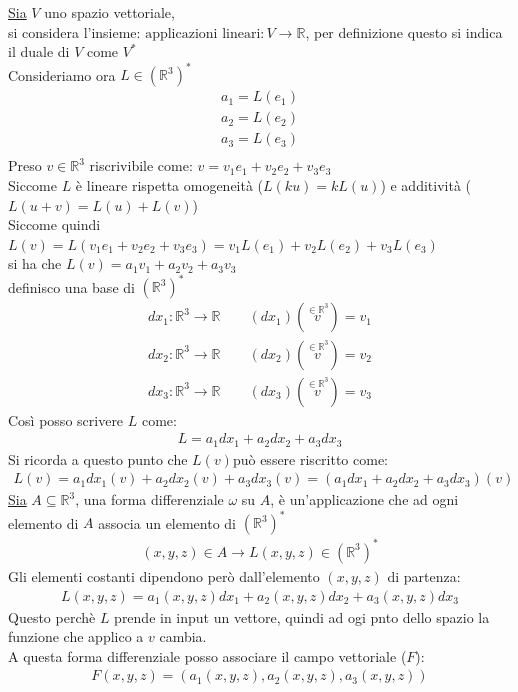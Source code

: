 \documentclass[a4paper, oneside]{article}
\begin{document}
\begin{definition}
    \underline{Sia} $V$ uno spazio vettoriale,\\
    si considera l'insieme: $\text{applicazioni lineari} :V \to \mathbb{R}$, per definizione questo si indica il duale di $V$ come $V^*$\\
    Consideriamo ora $L \in (\mathbb{R}^{3})^*$
    \begin{gather*}
        a_1=L(e_1)\\
        a_2=L(e_2)\\
        a_3=L(e_3)\\
    \end{gather*}
    Preso $v \in \mathbb{R}^3$ riscrivibile come: $v = v_1 e_1 + v_2 e_2 + v_3 e_3$\\
    Siccome $L$ è lineare rispetta omogeneità ($L(ku) = kL(u)$) e additività ($L(u+v) = L(u) + L(v)$)\\
    Siccome quindi $L(v) = L(v_1 e_1 + v_2 e_2 + v_3 e_3) = v_1 L(e_1) + v_2 L(e_2) + v_3 L(e_3)$\\
    si ha che $L(v) = a_1v_1+a_2v_2+a_3v_3$\\
    definisco una base di $(\mathbb{R}^3)^*$
    \begin{gather*}
        dx_1 : \mathbb{R}^3 \to \mathbb{R} \qquad (dx_1)(\overset{\in \mathbb{R}^3}{v}) = v_1\\
        dx_2 : \mathbb{R}^3 \to \mathbb{R} \qquad (dx_2)(\overset{\in \mathbb{R}^3}{v}) = v_2\\
        dx_3 : \mathbb{R}^3 \to \mathbb{R} \qquad (dx_3)(\overset{\in \mathbb{R}^3}{v}) = v_3
    \end{gather*}
    Così posso scrivere $L$ come:
    \begin{gather*}
        L = a_1 dx_1 + a_2 dx_2 + a_3 dx_3
    \end{gather*}
    Si ricorda a questo punto che $L(v)$può essere riscritto come:
    \begin{gather*}
        L(v) = a_1 dx_1(v) + a_2 dx_2(v) + a_3 dx_3(v) = (a_1 dx_1 + a_2 dx_2 + a_3 dx_3)(v)
    \end{gather*}
    \underline{Sia} $A \subseteq \mathbb{R}^3$, una forma differenziale $\omega$ su $A$, è un'applicazione che ad ogni elemento di $A$ associa un elemento di $(\mathbb{R}^3)^*$ 
    \begin{gather*}
        (x,y,z) \in A \longrightarrow L (x,y,z) \in (\mathbb{R}^3)^*
    \end{gather*}
    Gli elementi costanti dipendono però dall'elemento $(x,y,z)$ di partenza:
    \begin{gather*}
        L(x,y,z) = a_1(x,y,z) dx_1 + a_2(x,y,z) dx_2 + a_3(x,y,z) dx_3
    \end{gather*}
    Questo perchè $L$ prende in input un vettore, quindi ad ogi pnto dello spazio la funzione che applico a $v$ cambia.\\
    A questa forma differenziale posso associare il campo vettoriale ($F$):
    \begin{gather*}
        F(x,y,z) = (a_1(x,y,z),a_2(x,y,z),a_3(x,y,z))
    \end{gather*}
\end{definition}
\end{document}
